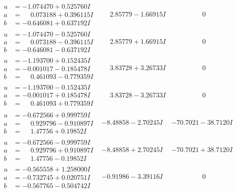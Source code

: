 \documentclass[1p]{elsarticle_modified}
\theoremstyle{definition}
\begin{document}
$$\begin{array}{c|c|c}
\begin{aligned}
u &= -1.074470 + 0.525760 I \\
a &= \phantom{-}0.073188 + 0.396115 I \\
b &= -0.646081 + 0.637192 I\end{aligned}
 & \phantom{-}2.85779 - 1.66915 I & \phantom{-0.000000 } 0 \\ \hline\begin{aligned}
u &= -1.074470 - 0.525760 I \\
a &= \phantom{-}0.073188 - 0.396115 I \\
b &= -0.646081 - 0.637192 I\end{aligned}
 & \phantom{-}2.85779 + 1.66915 I & \phantom{-0.000000 } 0 \\ \hline\begin{aligned}
u &= -1.193700 + 0.152435 I \\
a &= -0.001017 - 0.185478 I \\
b &= \phantom{-}0.461093 - 0.779359 I\end{aligned}
 & \phantom{-}3.83728 + 3.26733 I & \phantom{-0.000000 } 0 \\ \hline\begin{aligned}
u &= -1.193700 - 0.152435 I \\
a &= -0.001017 + 0.185478 I \\
b &= \phantom{-}0.461093 + 0.779359 I\end{aligned}
 & \phantom{-}3.83728 - 3.26733 I & \phantom{-0.000000 } 0 \\ \hline\begin{aligned}
u &= -0.672566 + 0.999759 I \\
a &= \phantom{-}0.929796 - 0.910897 I \\
b &= \phantom{-}1.47756 + 0.19852 I\end{aligned}
 & -8.48858 - 2.70245 I & -70.7021 - 38.7120 I \\ \hline\begin{aligned}
u &= -0.672566 - 0.999759 I \\
a &= \phantom{-}0.929796 + 0.910897 I \\
b &= \phantom{-}1.47756 - 0.19852 I\end{aligned}
 & -8.48858 + 2.70245 I & -70.7021 + 38.7120 I \\ \hline\begin{aligned}
u &= -0.565558 + 1.258000 I \\
a &= -0.732745 + 0.020751 I \\
b &= -0.567765 - 0.504742 I\end{aligned}
 & -0.91986 - 3.39116 I & \phantom{-0.000000 } 0 \\ \hline\begin{aligned}

\end{aligned}
\end{array}$$
\end{document}
